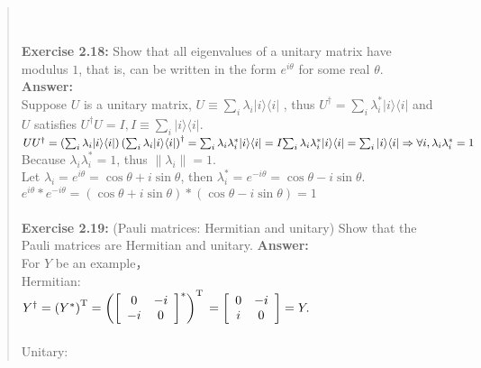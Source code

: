 \documentclass[UTF8]{ctexart}
\begin{document}
\begin{quote}
	\\	\\
\textbf{Exercise 2.18:} Show that all eigenvalues of a unitary matrix have modulus $1$, that is, can be written in the form $e^{i\theta}$ for some real ${\theta}$. \\
\textbf{Answer:}\\
	 \hspace*{0.6cm}Suppose $U$ is a unitary matrix,  $U\equiv \sum_{i}\lambda_{i}|i\rangle\langle i|$ , thus    $U^{\dagger} = \sum_{i}\lambda_{i}^{*}|i\rangle\langle i|$ and $U$ satisfies $U^{\dagger}U=I, I \equiv \sum_{i}|i\rangle\langle i|$. 
	\\ 
	${U U^{\dagger}=\left(\sum_{i} \lambda_{i}|i\rangle \langle i|\right)\left(\sum_{i} \lambda_{i}|i\rangle\langle i|\right)^{\dagger}=\sum_{i} \lambda_{i} \lambda_{i}^{*}|i\rangle\langle i|=I} \\ {\sum_{i} \lambda_{i} \lambda_{i}^{*}|i\rangle\langle i|=\sum_{i}| i\rangle\langle i| \Rightarrow \forall i, \lambda_{i} \lambda_{i}^{*}=1}$
	\\
	Because $\lambda_{i} \lambda_{i}^{*}=1$, thus $\left\|\lambda_{i}\right\|=1$. \\ 
	Let $\lambda_{i}={e}^{i \theta}=\cos \theta+{i} \sin \theta$, then $ \lambda_{i}^{*}={e}^{-i \theta}=\cos \theta-{i} \sin \theta.$
	\\
	${e}^{i \theta}*{e}^{-i \theta}=(\cos \theta+{i} \sin \theta)*(\cos \theta-{i} \sin \theta)=1$
	\\
	\\  
\textbf{Exercise 2.19:} (Pauli matrices: Hermitian and unitary) Show that the Pauli matrices are Hermitian and unitary.
\textbf{Answer:}\\
	 \hspace*{0.6cm}For $Y$ be an example，\\
	Hermitian:\\
	$Y^{\dagger}=\left(Y^{*}\right)^{\mathrm{T}}=\left(\left[\begin{array}{cc}{0} & {-i} \\ {-i} & {0}\end{array}\right]^{\mathrm{*}}	\right)^{\mathrm{T}}\\=\left[\begin{array}{cc}{0} & {-i} \\ {i} & {0}\end{array}\right]=Y.$ 
	\\ \\
	 Unitary:\\

\end{quote}
\end{document}
